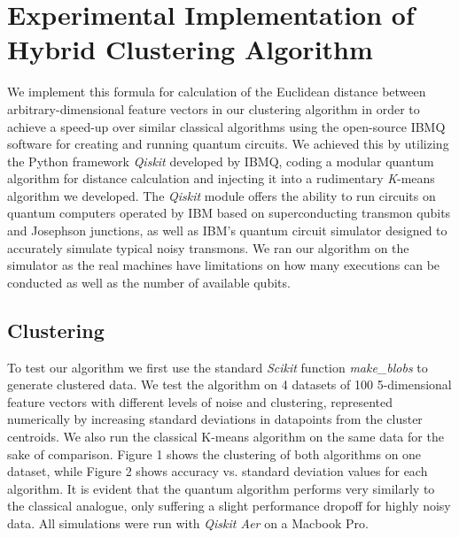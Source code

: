 \documentclass[twocolumn, english]{revtex4-2}
\begin{document}
\section{Experimental Implementation of Hybrid Clustering Algorithm}
We implement this formula for calculation of the Euclidean distance between arbitrary-dimensional feature vectors in our clustering algorithm in order to achieve a speed-up over similar classical algorithms using the open-source IBMQ software for creating and running quantum circuits. We achieved this by utilizing the Python framework \textit{Qiskit} developed by IBMQ, coding a modular quantum algorithm for distance calculation and injecting it into a rudimentary \textit{K}-means algorithm we developed. The \textit{Qiskit} module offers the ability to run circuits on quantum computers operated by IBM based on superconducting transmon qubits and Josephson junctions, as well as IBM's quantum circuit simulator designed to accurately simulate typical noisy transmons. We ran our algorithm on the simulator as the real machines have limitations on how many executions can be conducted as well as the number of available qubits. 

\subsection{Clustering}
To test our algorithm we first use the standard \textit{Scikit} function \textit{make\_blobs} to generate clustered data. We test the algorithm on 4 datasets of 100 5-dimensional feature vectors with different levels of noise and clustering, represented numerically by increasing standard deviations in datapoints from the cluster centroids. We also run the classical K-means algorithm on the same data for the sake of comparison. Figure 1 shows the clustering of both algorithms on one dataset, while Figure 2 shows accuracy vs. standard deviation values for each algorithm. It is evident that the quantum algorithm performs very similarly to the classical analogue, only suffering a slight performance dropoff for highly noisy data. All simulations were run with \textit{Qiskit Aer} on a Macbook Pro.
\end{document}
